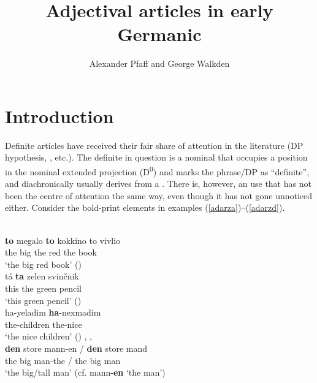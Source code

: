 \documentclass[output=paper,colorlinks,citecolor=brown]{langscibook}
\author{Alexander Pfaff\orcid{}\affiliation{University of Stuttgart} and George Walkden\orcid{0000-0001-5950-9686}\affiliation{University of Konstanz}}
\title{Adjectival articles in early Germanic}
\begin{document}
\maketitle

\section{Introduction} 

Definite articles have received their fair share of attention in the literature (DP hypothesis, ,  etc.).     
The definite  in question is a nominal  that occupies a position in the nominal extended projection (D\textsuperscript{0}) and marks the  phrase/DP as ``definite'', and diachronically usually derives from a . There is, however, an  use that has not been the centre of attention the same way, even though it has not gone unnoticed either. Consider the bold-print elements in examples (\ref{adarza})--(\ref{adarzd}).  %

\begin{exe}
\ex  \label{adarz}
    \begin{xlist}
        \ex  \label{adarza}  \\ 
        \gll \textbf{to}  megalo \textbf{to} kokkino to vivlio     \\  
        the big the red the book    \\    
        \glt `the big red book'  (\citealt{alexiadouWilder})
        \ex \label{adarzb}  \\ 
        \gll   tá  \textbf{ta} zelen svinčnik   \\   
        this the green pencil \\
        \glt `this green pencil' (\citealt{LankoZaucer})
        \ex {} \\ 
        \gll ha-yeladim \textbf{ha}-nexmadim   \\
         the-children the-nice  \\
         \glt `the nice children'  (\citealt{Ritter91})
        \ex  \label{adarzd} , ,  \\ 
        \gll \textbf{den} store mann-en / \textbf{den} store mand   \\ 
        the big man-the / the big man  \\
      \glt  `the big/tall man'   (cf. mann-\textbf{en} `the man')
\end{xlist} 
\end{exe} 
\end{document}
